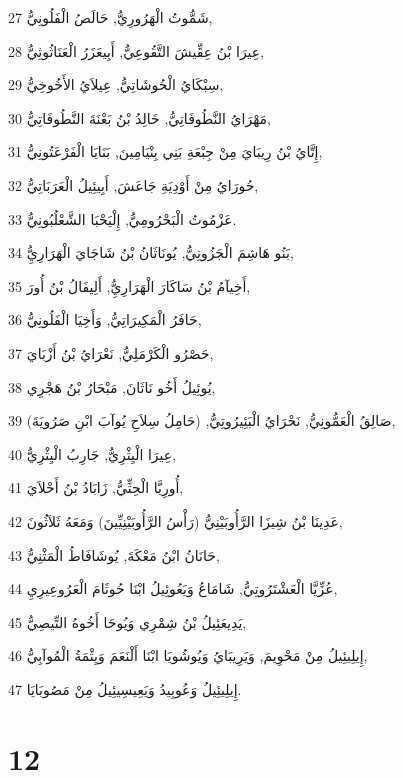 \par 27 شَمُّوتُ الْهَرُورِيُّ, حَالَصُ الْفَلُونِيُّ,
\par 28 عِيرَا بْنُ عِقِّيشَ التَّقُوعِيُّ, أَبِيعَزَرُ الْعَنَاثُوثِيُّ,
\par 29 سِبْكَايُ الْحُوشَاتِيُّ, عِيلاَيُ الأَخُوخِيُّ,
\par 30 مَهْرَايُ النَّطُوفَاتِيُّ, خَالِدُ بْنُ بَعْنَةَ النَّطُوفَاتِيُّ,
\par 31 إِتَّايُ بْنُ رِيبَايَ مِنْ جِبْعَةِ بَنِي بِنْيَامِينَ, بَنَايَا الْفَرْعَتُونِيُّ,
\par 32 حُورَايُ مِنْ أَوْدِيَةِ جَاعَشَ, أَبِيئِيلُ الْعَرَبَاتِيُّ,
\par 33 عَزْمُوتُ الْبَحْرُومِيُّ, إِلْيَحْبَا الشَّعْلُبُونِيُّ.
\par 34 بَنُو هَاشِمَ الْجَزُونِيُّ, يُونَاثَانُ بْنُ شَاجَايَ الْهَرَارِيُِّ,
\par 35 أَخِيآمُ بْنُ سَاكَارَ الْهَرَارِيُِّ, أَلِيفَالُ بْنُ أُورَ,
\par 36 حَافَرُ الْمَكِيرَاتِيُّ, وَأَخِيَا الْفَلُونِيُّ,
\par 37 حَصْرُو الْكَرْمَلِيُّ, نَعْرَايُ بْنُ أَزْبَايَ,
\par 38 يُوئِيلُ أَخُو نَاثَانَ, مَبْحَارُ بْنُ هَجْرِي,
\par 39 صَالِقُ الْعَمُّونِيُّ, نَحْرَايُ الْبَئِيرُوتِيُّ, (حَامِلُ سِلاَحِ يُوآبَ ابْنِ صَرُويَةَ),
\par 40 عِيرَا الْيِثْرِيُّ, جَارِبُ الْيِثْرِيُّ,
\par 41 أُورِيَّا الْحِثِّيُّ, زَابَادُ بْنُ أَحْلاَيَ,
\par 42 عَدِينَا بْنُ شِيزَا الرَّأُوبَيْنِيُّ (رَأْسُ الرَّأُوبَيْنِيِّينَ) وَمَعَهُ ثَلاَثُونَ,
\par 43 حَانَانُ ابْنُ مَعْكَةَ, يُوشَافَاطُ الْمَثْنِيُّ,
\par 44 عُزِّيَّا الْعَشْتَرُوتِيُّ, شَامَاعُ وَيَعُوئِيلُ ابْنَا حُوثَامَ الْعَرُوعِيرِيِ,
\par 45 يَدِيعَئِيلُ بْنُ شِمْرِي وَيُوحَا أَخُوهُ التِّيصِيُّ,
\par 46 إِيلِيئِيلُ مِنْ مَحْوِيمَ, وَيَرِيبَايُ وَيُوشُويَا ابْنَا أَلْنَعَمَ وَيِثْمَةُ الْمُوآبِيُّ,
\par 47 إِيلِيئِيلُ وَعُوبِيدُ وَيَعِيسِيئِيلُ مِنْ مَصُوبَايَا.

\chapter{12}

